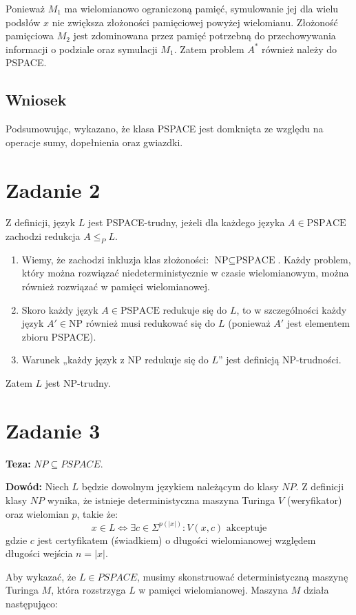 \documentclass{article}
\begin{document}
Ponieważ $M_1$ ma wielomianowo ograniczoną pamięć, symulowanie jej dla wielu podsłów $x$ nie zwiększa złożoności pamięciowej powyżej wielomianu. Złożoność pamięciowa $M_2$ jest zdominowana przez pamięć potrzebną do przechowywania informacji o podziale oraz symulacji $M_1$. Zatem problem $A^*$ również należy do PSPACE.

\subsection*{Wniosek}
Podsumowując, wykazano, że klasa PSPACE jest domknięta ze względu na operacje sumy, dopełnienia oraz gwiazdki.

\section{Zadanie 2}
Z definicji, język $L$ jest PSPACE-trudny, jeżeli dla każdego języka $A \in \text{PSPACE}$ zachodzi redukcja $A \le_P L$.
\begin{enumerate}
    \item Wiemy, że zachodzi inkluzja klas złożoności: $\text{NP} \subseteq \text{PSPACE}$. Każdy problem, który można rozwiązać niedeterministycznie w czasie wielomianowym, można również rozwiązać w pamięci wielomianowej.
    \item Skoro każdy język $A \in \text{PSPACE}$ redukuje się do $L$, to w szczególności każdy język $A' \in \text{NP}$ również musi redukować się do $L$ (ponieważ $A'$ jest elementem zbioru PSPACE).
    \item Warunek „każdy język z NP redukuje się do $L$” jest definicją NP-trudności.
\end{enumerate}
Zatem $L$ jest NP-trudny.

\section{Zadanie 3}


\textbf{Teza:} $NP \subseteq PSPACE$.

\textbf{Dowód:}
Niech $L$ będzie dowolnym językiem należącym do klasy $NP$. Z definicji klasy $NP$ wynika, że istnieje deterministyczna maszyna Turinga $V$ (weryfikator) oraz wielomian $p$, takie że:
\[ x \in L \iff \exists c \in \Sigma^{p(|x|)} : V(x, c) \text{ akceptuje} \]
gdzie $c$ jest certyfikatem (świadkiem) o długości wielomianowej względem długości wejścia $n = |x|$.

Aby wykazać, że $L \in PSPACE$, musimy skonstruować deterministyczną maszynę Turinga $M$, która rozstrzyga $L$ w pamięci wielomianowej. Maszyna $M$ działa następująco:
\end{document}
